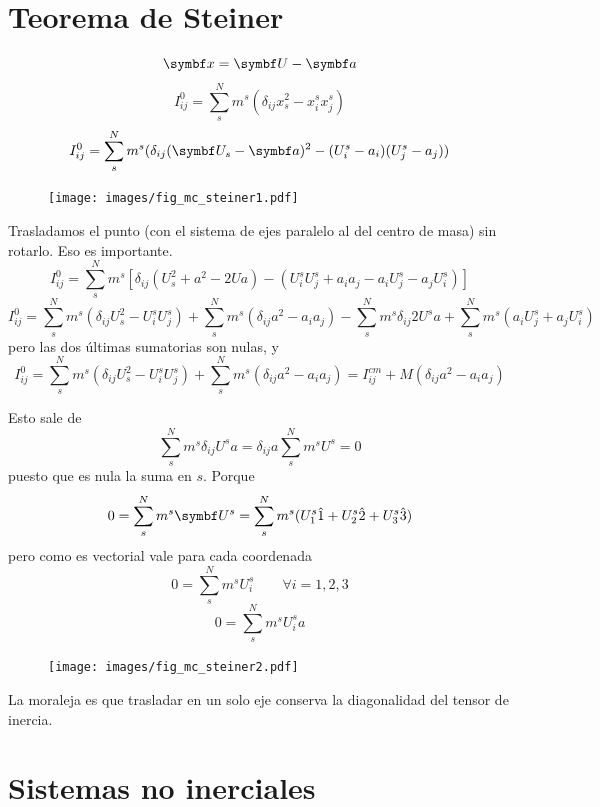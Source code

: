 \documentclass[10pt,oneside]{CBFT_book}
\begin{document}
\section{Teorema de Steiner}

\[
	\vb{x} = \vb{U} - \vb{a}  
\]
\[
	I_{ij}^0 = \sum_s^N m^s ( \delta_{ij} x_s^2 - x_i^s x_j^s )
\]
\[
	I_{ij}^0 = \sum_s^N m^s ( \delta_{ij} ( \vb{U}_s - \vb{a} )^2 - (U^s_i - a_i) ( U^s_j - a_j ) )
\]
\begin{figure}[htb]
	\begin{center}
	\texttt{[image: images/fig\_mc\_steiner1.pdf]}	 
	\end{center}
	\caption{}
\end{figure} 
Trasladamos el punto (con el sistema de ejes paralelo al del centro de masa) sin rotarlo. Eso es importante.
\[
	I_{ij}^0 = \sum_s^N m^s \left[  \delta_{ij} ( U_s^2 + a^2 - 2Ua ) -
			( U^s_iU^s_j + a_i a_j - a_i U^s_j - a_j U^s_i ) \right]
\]
\[
	I_{ij}^0 = \sum_s^N m^s ( \delta_{ij} U_s^2 - U^s_iU^s_j ) + \sum_s^N m^s ( \delta_{ij} a^2 - a_i a_j )
			- \sum_s^N m^s \delta_{ij} 2 U^s a  + \sum_s^N m^s ( a_i U^s_j + a_j U^s_i )
\]
pero las dos últimas sumatorias son nulas, y
\[
	I_{ij}^0 = \sum_s^N m^s ( \delta_{ij} U_s^2 - U^s_iU^s_j ) + \sum_s^N m^s ( \delta_{ij} a^2 - a_i a_j )
		= I_{ij}^{cm}  + M ( \delta_{ij} a^2 - a_i a_j )
\]

Esto sale de
\[
	\sum_s^N m^s \delta_{ij} U^s a = \delta_{ij} a \sum_s^N m^s  U^s  = 0
\]
puesto que es nula la suma en $s$. Porque 
\[
	0 = \sum_s^N m^s \vb{U}^s = \sum_s^N m^s ( U_1^s \hat{1} + U_2^s \hat{2} + U_3^s \hat{3} )
\]
pero como es vectorial vale para cada coordenada 
\[
	0 = \sum_s^N m^s U_i^s \qquad \forall i=1,2,3
\]
\[
	0 = \sum_s^N m^s U_i^s a
\]
\begin{figure}
	\begin{center}
	\texttt{[image: images/fig\_mc\_steiner2.pdf]}	 
	\end{center}
	\caption{}
\end{figure} 
La moraleja es que trasladar en un solo eje conserva la diagonalidad del tensor de inercia.

\section{Sistemas no inerciales}
\end{document}
